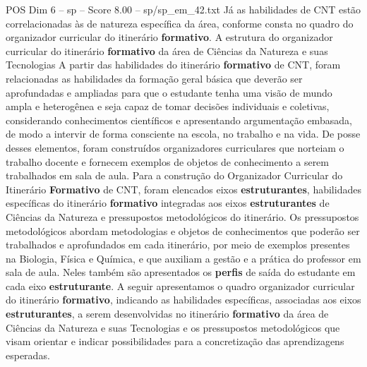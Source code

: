 \begin{textsample}{POS Dim 6 – sp – Score 8.00 – sp/sp\_em\_42.txt}
Já as habilidades de CNT estão correlacionadas às de natureza específica da área, conforme consta no quadro do organizador curricular do itinerário \textbf{formativo}.
A estrutura do organizador curricular do itinerário \textbf{formativo} da área de Ciências da Natureza e suas Tecnologias A partir das habilidades do itinerário \textbf{formativo} de CNT, foram relacionadas as habilidades da formação geral básica que deverão ser aprofundadas e ampliadas para que o estudante tenha uma visão de mundo ampla e heterogênea e seja capaz de tomar decisões individuais e coletivas, considerando conhecimentos científicos e apresentando argumentação embasada, de modo a intervir de forma consciente na escola, no trabalho e na vida.
De posse desses elementos, foram construídos organizadores curriculares que norteiam o trabalho docente e fornecem exemplos de objetos de conhecimento a serem trabalhados em sala de aula.
Para a construção do Organizador Curricular do Itinerário \textbf{Formativo} de CNT, foram elencados eixos \textbf{estruturantes}, habilidades específicas do itinerário \textbf{formativo} integradas aos eixos \textbf{estruturantes} de Ciências da Natureza e pressupostos metodológicos do itinerário.
Os pressupostos metodológicos abordam metodologias e objetos de conhecimentos que poderão ser trabalhados e aprofundados em cada itinerário, por meio de exemplos presentes na Biologia, Física e Química, e que auxiliam a gestão e a prática do professor em sala de aula.
Neles também são apresentados os \textbf{perfis} de saída do estudante em cada eixo \textbf{estruturante}.
A seguir apresentamos o quadro organizador curricular do itinerário \textbf{formativo}, indicando as habilidades específicas, associadas aos eixos \textbf{estruturantes}, a serem desenvolvidas no itinerário \textbf{formativo} da área de Ciências da Natureza e suas Tecnologias e os pressupostos metodológicos que visam orientar e indicar possibilidades para a concretização das aprendizagens esperadas.

\end{textsample}
